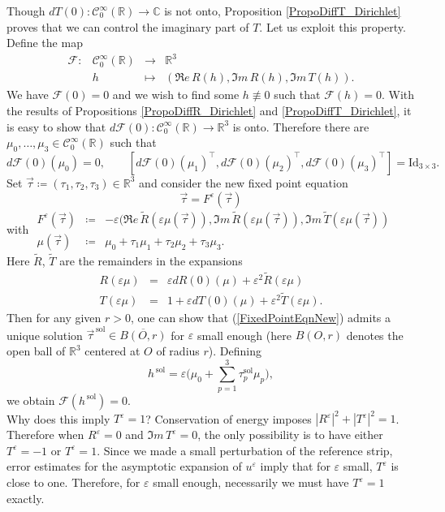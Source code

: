 \documentclass[11pt,a4paper]{report}
\newcommand{\dsp}{\displaystyle}
\newcommand{\eps}{\varepsilon}
\newcommand{\mrm}[1]{\mathrm{#1}}
\newcommand{\Cplx}{\mathbb{C}}
\newcommand{\R}{\mathbb{R}}
\begin{document}
\noindent Though $dT(0):\mathscr{C}^\infty_0(\R)\to\Cplx$ is not onto, Proposition \ref{PropoDiffT_Dirichlet} proves that we can control the imaginary part of $T$. Let us exploit this property.\\
\newline
Define the map
\begin{equation}\label{DefFT1D}
\begin{array}{rccl}
\mathscr{F}: & \mathscr{C}^\infty_0(\R) &\to &\R^3 \\[4pt] 
 & h & \mapsto & (\Re e\,R(h),\Im m\,R(h),\Im m\,T(h)).
\end{array}
\end{equation}
We have $\mathscr{F}(0)=0$ and we wish to find some $h\not\equiv 0$ such that $\mathscr{F}(h)=0$. With the results of Propositions \ref{PropoDiffR_Dirichlet} and \ref{PropoDiffT_Dirichlet}, it is easy to show that $d\mathscr{F}(0):\mathscr{C}^\infty_0(\R)\to\R^3$ is onto. Therefore there are $\mu_0,\dots,\mu_3\in \mathscr{C}^\infty_0(\R)$ such that
\[
d\mathscr{F}(0)(\mu_0)=0,\qquad [d\mathscr{F}(0)(\mu_1)^\top,d\mathscr{F}(0)(\mu_2)^\top,d\mathscr{F}(0)(\mu_3)^\top]=\mrm{Id}_{3\times3}.
\]
Set $\vec{\tau}\coloneqq(\tau_1,\tau_2,\tau_3)\in\R^3$ and consider the new fixed point equation
\begin{equation}\label{FixedPointEqnNew}
\vec{\tau}=F^\eps(\vec{\tau})
\end{equation}
with \hspace{1cm}
$\dsp\begin{array}{|rcl}
F^\eps(\vec{\tau})&\coloneqq&-\eps(\Re e\,\tilde{R}(\eps\mu(\vec{\tau})),\Im m\,\tilde{R}(\eps\mu(\vec{\tau})),\Im m\,\tilde{T}(\eps\mu(\vec{\tau})) \\[4pt]
\mu(\vec{\tau})&\coloneqq&\mu_0+\tau_1\mu_1+\tau_2\mu_2+\tau_3\mu_3.
\end{array}$\\[4pt]
Here $\tilde{R}$, $\tilde{T}$ are the remainders in the expansions 
\[
\begin{array}{rcl}
R(\eps \mu)&=&  \eps dR(0)(\mu)+\eps^2 \tilde{R}(\eps \mu)\\[2pt]
T(\eps \mu)&=& 1+ \eps dT(0)(\mu)+\eps^2 \tilde{T}(\eps \mu).
\end{array}
\]
Then for any given $r>0$, one can show that (\ref{FixedPointEqnNew}) admits a unique solution $\vec{\tau}^{\,\mrm{sol}}\in\overline{B(O,r)}$ for $\eps$ small enough (here $B(O,r)$ denotes the open ball of $\R^3$ centered at $O$ of radius $r$). Defining 
\[
h^{\,\mrm{sol}}=\eps\bigg(\mu_0+\sum_{p=1}^3\tau_p^{\mrm{sol}}\mu_p\bigg),
\]
we obtain $\mathscr{F}(h^{\,\mrm{sol}})=0$.\\ 
\newline
Why does this imply $T^\eps=1$? Conservation of energy imposes $|R^\eps|^2+|T^\eps|^2=1$. Therefore when $R^\eps=0$ and $\Im m\,T^\eps=0$, the only possibility is to have either $T^\eps=-1$ or $T^\eps=1$. Since we made a small perturbation of the reference strip, error estimates for the asymptotic expansion of $u^\eps$ imply that for $\eps$ small, $T^\eps$ is close to one. Therefore, for $\eps$ small enough, necessarily we must have $T^\eps=1$ exactly.
\end{document}
